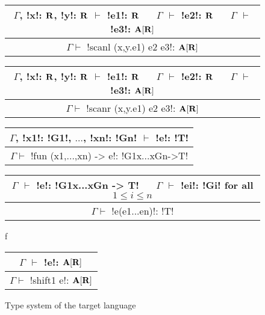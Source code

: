\begin{figure*}[tb]
    \centering

    \begin{tabular}{c}
        $\Gamma$, !x!: $\mathbf{R}$, !y!: $\mathbf{R}$ $\vdash$ !e1!: $\mathbf{R}$ 
        $\quad$ $\Gamma$ $\vdash$ !e2!: $\mathbf{R}$
        $\quad$ $\Gamma$ $\vdash$ !e3!: $\mathbf{A}[\mathbf{R}]$
        \\\hline  
        $\Gamma \vdash$ !scanl (x,y.e1) e2 e3!: $\mathbf{A}[\mathbf{R}]$
    \end{tabular}

    \begin{tabular}{c}
        $\Gamma$, !x!: $\mathbf{R}$, !y!: $\mathbf{R}$ $\vdash$ !e1!: $\mathbf{R}$ 
        $\quad$ $\Gamma$ $\vdash$ !e2!: $\mathbf{R}$
        $\quad$ $\Gamma$ $\vdash$ !e3!: $\mathbf{A}[\mathbf{R}]$
        \\\hline  
        $\Gamma \vdash$ !scanr (x,y.e1) e2 e3!: $\mathbf{A}[\mathbf{R}]$
    \end{tabular}

    \begin{tabular}{c}
        $\Gamma$, !x1!: !G1!, $\ldots$, !xn!: !Gn! $\vdash$ !e!: !T! 
        \\\hline  
        $\Gamma \vdash$ !fun (x1,...,xn) -> e!: !G1x...xGn->T!
    \end{tabular}

    \begin{tabular}{c}
        $\Gamma$ $\vdash$ !e!: !G1x...xGn -> T!
        $\quad$ $\Gamma$ $\vdash$ !ei!: !Gi! for all $1\leq i\leq n$
        \\\hline  
        $\Gamma \vdash$ !e(e1...en)!: !T!
    \end{tabular}f

    \begin{tabular}{c}
        $\Gamma$ $\vdash$ !e!: $\mathbf{A}[\mathbf{R}]$
        \\\hline  
        $\Gamma \vdash$ !shift1 e!: $\mathbf{A}[\mathbf{R}]$
    \end{tabular}

    \vspace{-0.2cm}
    \caption{Type system of the target language}
    \vspace{-0.4cm}
    \label{fig:target_typesystem}
    \end{figure*}